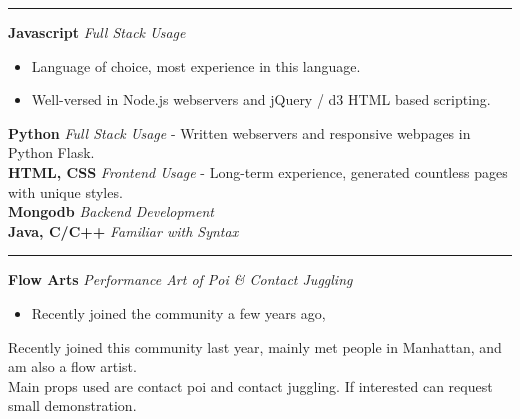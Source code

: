 \documentclass[14]{article}
\begin{document}
  \vspace{0.1cm} \hrule \vspace{0.3cm}
  \noindent
  \textbf{Javascript} \textit{Full Stack Usage}
  \begin{itemize}[label={--},noitemsep, topsep=0pt]
    \item Language of choice, most experience in this language.
    \item Well-versed in Node.js webservers and jQuery / d3 HTML based scripting.
  \end{itemize}
  \textbf{Python}\textit{ Full Stack Usage}
    - Written webservers and responsive webpages in Python Flask.\\
  \textbf{HTML, CSS} \textit{ Frontend Usage}
    - Long-term experience, generated countless pages with unique styles.\\
  \textbf{Mongodb}\textit{ Backend Development}\\
  \textbf{ Java, C/C++} \textit{ Familiar with Syntax}\\

  \vspace{0.1cm} \hrule \vspace{0.3cm}
  \noindent\textbf{Flow Arts}\textit{ Performance Art of Poi \& Contact Juggling}
  \begin{itemize}[label={--},noitemsep, topsep=0pt]
    \item Recently joined the community a few years ago,
  \end{itemize}
  Recently joined this community last year, mainly met people in Manhattan, and am also a flow artist.\\
  Main props used are contact poi and contact juggling. If interested can request small demonstration.
\end{document}
